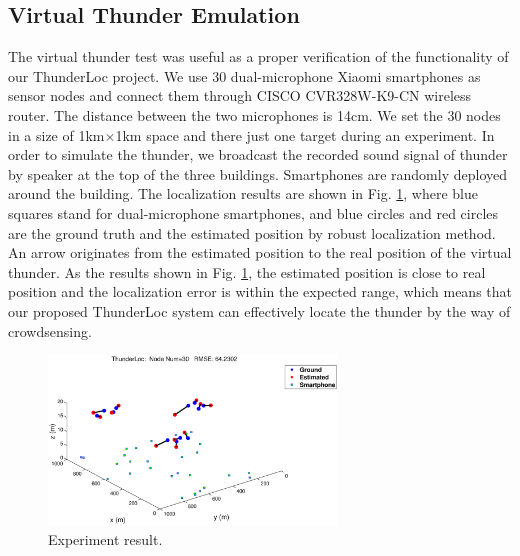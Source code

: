 \subsection{Virtual Thunder Emulation}

The virtual thunder test was useful as a proper verification of the functionality of our ThunderLoc project. 
We use 30 dual-microphone Xiaomi smartphones as sensor nodes and connect them through CISCO CVR328W-K9-CN wireless router. 
The distance between the two microphones is 14cm. We set the 30 nodes in a size of 1km$\times$1km space and there just one target during an experiment.
In order to simulate the thunder, we broadcast the recorded sound signal of thunder by speaker at the top of the three buildings. 
Smartphones are randomly deployed around the building.
The localization results are shown in Fig. \ref{Virtual}, where blue squares stand for dual-microphone smartphones, and blue circles and red circles are the ground truth and the estimated position by robust localization method. 
An arrow originates from the estimated position to the real position of the virtual thunder. 
As the results shown in Fig. \ref{Virtual}, the estimated position is close to real position and the localization error is within the expected range,
which means that our proposed ThunderLoc system can effectively locate the thunder  by the way of crowdsensing.
  \begin{figure}[ht]
            \setlength{\abovecaptionskip}{0pt}
            \centering
            \includegraphics[scale=2,height=4.5cm]{image/virtual.eps}
     \vspace{2mm}
            \caption{Experiment result.}
            \label{Virtual}
            \vspace{-8mm}
  \end{figure}


